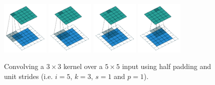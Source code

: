 \documentclass{article}
\begin{document}
\begin{figure}[t]
    \centering
    \includegraphics[width=0.2\textwidth]{pdf/same_padding_no_strides_00.pdf}
    \includegraphics[width=0.2\textwidth]{pdf/same_padding_no_strides_01.pdf}
    \includegraphics[width=0.2\textwidth]{pdf/same_padding_no_strides_02.pdf}
    \includegraphics[width=0.2\textwidth]{pdf/same_padding_no_strides_03.pdf}
    \caption{\label{fig:same_padding_no_strides} Convolving a $3 \times 3$
        kernel over a $5 \times 5$ input using half padding and unit strides
        (i.e. $i = 5$, $k = 3$, $s = 1$ and $p = 1$).}
\end{figure}
\end{document}
